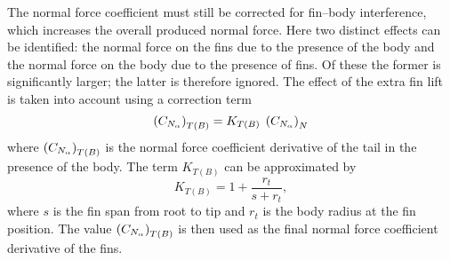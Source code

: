 The normal force coefficient must still be corrected for fin--body
interference, which increases the overall produced normal force.  Here
two distinct effects can be identified: the normal force on the fins
due to the presence of the body and the normal force on the body due
to the presence of fins.  Of these the former is significantly larger;
the latter is therefore ignored.  The effect of the extra fin lift is
taken into account using a correction term
%
\begin{equation}
\del{\CNa}_{T(B)} = K_{T(B)}\;\del{\CNa}_N
\end{equation}
%
where $\del{\CNa}_{T(B)}$ is the normal force coefficient derivative
of the tail in the presence of the body.  The term $K_{T(B)}$ can be
approximated by~\cite{barrowman-rd}
%
\begin{equation}
K_{T(B)} = 1 + \frac{r_t}{s + r_t},
\end{equation}
%
where $s$ is the fin span from root to tip and $r_t$ is the body
radius at the fin position.  The value $\del{\CNa}_{T(B)}$ is then
used as the final normal force coefficient derivative of the fins.



